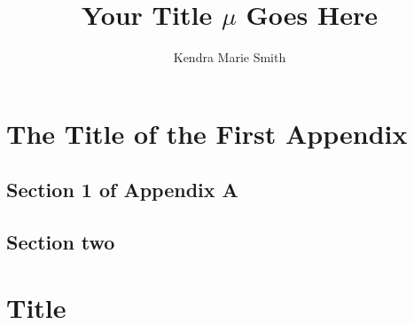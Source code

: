 \documentclass[doublespace,nopageskip]{UVAthesis}
\title{Your Title $\mu$ Goes Here}
\author{Kendra Marie Smith}
\begin{document}
  \frontmatter
  \maketitle
  \tableofcontents

% 
	\listoffigures
	\listoftables

 
 
 

        \mainmatter


        
        
        
      
	\printbibliography[heading=bibintoc]
	   


	\begin{appendices}
		\chapter{The Title of the First Appendix}
		\label{app:appendixA}%
		\lipsum[3]
			\section{Section 1 of Appendix A} \label{app:appendixA_1}
			\lipsum[4]
				
			\section{Section two} \label{app:appendixA_2}
			\lipsum[5]
				
		\chapter{Title} 
		\label{app:appendixB}
			\lipsum[6-7]
	\end{appendices}
\end{document}
